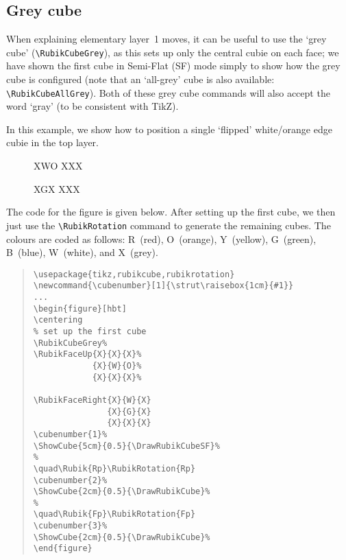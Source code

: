 \documentclass[a4paper]{article}
\newcommand{\cubenumber}[1]{\strut\raisebox{1cm}{#1}}
\begin{document}
\pagebreak
\subsection{Grey cube}
\label{sec:greycube}


When explaining elementary layer~1 moves, it can be useful to use the `grey cube' 
(\verb!\RubikCubeGrey!), as this  sets up only the central cubie on each face; 
we have shown the first cube in Semi-Flat (SF) mode simply to show  how the grey 
cube is configured  (note that an `all-grey' cube is also available: 
\verb!\RubikCubeAllGrey!). Both of these grey cube commands will also  accept 
the word `gray' (to be consistent with TikZ).

In this  example, we show how to position a single  `flipped'  white/orange edge 
cubie in the top  layer. 
  

\begin{figure}[hbt]

\centering%
\RubikCubeGrey%
%
            {X}{W}{O}%
            {X}{X}{X}%
               
               {X}{G}{X}
               {X}{X}{X}
%
\cubenumber{1}%
%
\quad{}
\cubenumber{2}%
%
\quad{}
\cubenumber{3}%
%
\end{figure}



{\noindent}The code for the figure is given below. 
After setting up the first cube, we then just use the \verb!\RubikRotation! 
command to generate the  remaining cubes.
The colours are coded as follows:  R~(red), O~(orange), Y~(yellow), 
G~(green), B~(blue),  W~(white),  and   X~(grey).

\begin{quote}
\begin{verbatim}
\usepackage{tikz,rubikcube,rubikrotation}
\newcommand{\cubenumber}[1]{\strut\raisebox{1cm}{#1}}
...
\begin{figure}[hbt]
\centering
% set up the first cube
\RubikCubeGrey%
\RubikFaceUp{X}{X}{X}%
            {X}{W}{O}%
            {X}{X}{X}%

\RubikFaceRight{X}{W}{X}
               {X}{G}{X}
               {X}{X}{X}
\cubenumber{1}%
\ShowCube{5cm}{0.5}{\DrawRubikCubeSF}%
%
\quad\Rubik{Rp}\RubikRotation{Rp}
\cubenumber{2}%
\ShowCube{2cm}{0.5}{\DrawRubikCube}%
%
\quad\Rubik{Fp}\RubikRotation{Fp}
\cubenumber{3}%
\ShowCube{2cm}{0.5}{\DrawRubikCube}%
\end{figure} 
\end{verbatim}
\end{quote}
\end{document}
